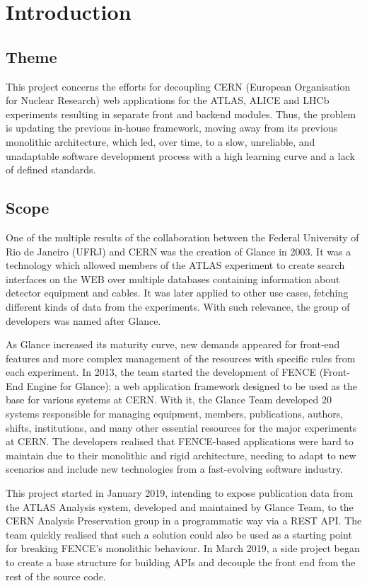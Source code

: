 \chapter{Introduction}
\label{chap1}

\section{Theme}

This project concerns the efforts for decoupling CERN (European Organisation for Nuclear Research) web applications for the ATLAS, ALICE and LHCb experiments resulting in separate front and backend modules. Thus, the problem is updating the previous in-house framework, moving away from its previous monolithic architecture, which led, over time, to a slow, unreliable, and unadaptable software development process with a high learning curve and a lack of defined standards.


\section{Scope}

One of the multiple results of the collaboration between the Federal University of Rio de Janeiro (UFRJ) and CERN was the creation of Glance in 2003. It was a technology which allowed members of the ATLAS experiment to create search interfaces on the WEB over multiple databases containing information about detector equipment and cables. It was later applied to other use cases, fetching different kinds of data from the experiments. With such relevance, the group of developers was named after Glance.

As Glance increased its maturity curve, new demands appeared for front-end features and more complex management of the resources with specific rules from each experiment. In 2013, the team started the development of FENCE (Front-End Engine for Glance): a web application framework designed to be used as the base for various systems at CERN. With it, the Glance Team developed 20 systems responsible for managing equipment, members, publications, authors, shifts, institutions, and many other essential resources for the major experiments at CERN. The developers realised that FENCE-based applications were hard to maintain due to their monolithic and rigid architecture, needing to adapt to new scenarios and include new technologies from a fast-evolving software industry. 

This project started in January 2019, intending to expose publication data from the ATLAS Analysis system, developed and maintained by Glance Team, to the CERN Analysis Preservation group in a programmatic way via a REST API. The team quickly realised that such a solution could also be used as a starting point for breaking FENCE’s monolithic behaviour. In March 2019, a side project began to create a base structure for building APIs and decouple the front end from the rest of the source code.


